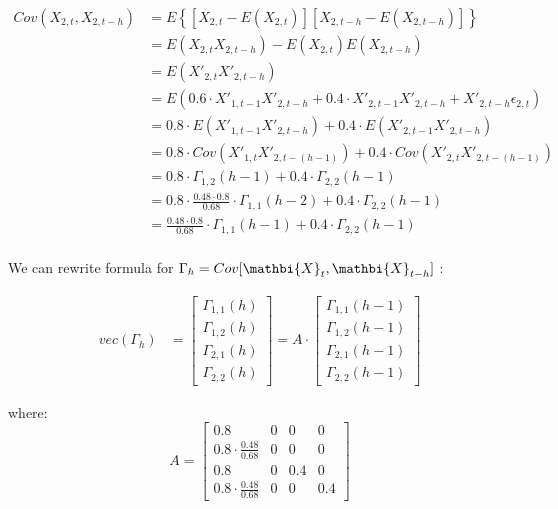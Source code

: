 \begin{solution}
\begin{equation}
\begin{aligned}
Cov(X_{2,t},X_{2,t-h}) 	& = E\left\{[X_{2,t} - E(X_{2,t})][X_{2,t-h} - E(X_{2,t-h})]\right\} \\
												& = E(X_{2,t}X_{2,t-h}) - E(X_{2,t})E(X_{2,t-h}) \\
												& = E(X'_{2,t}X'_{2,t-h})\\
												& = E\left(0.6 \cdot X'_{1,t-1}X'_{2,t-h} + 0.4 \cdot X'_{2,t-1}X'_{2,t-h} + X'_{2,t-h}\epsilon_{2,t} \right)\\
												& = 0.8 \cdot E(X'_{1,t-1}X'_{2,t-h}) + 0.4 \cdot E(X'_{2,t-1}X'_{2,t-h}) \\
												& = 0.8 \cdot Cov(X'_{1,t}X'_{2,t-(h-1)}) + 0.4 \cdot Cov(X'_{2,t}X'_{2,t-(h-1)}) \\
												& = 0.8 \cdot \Gamma_{1,2}(h-1) + 0.4 \cdot \Gamma_{2,2}(h-1) \\
												& = 0.8 \cdot\frac{0.48 \cdot 0.8}{0.68} \cdot \Gamma_{1,1}(h-2) + 0.4 \cdot \Gamma_{2,2}(h-1)\\
												& = \frac{0.48 \cdot 0.8}{0.68} \cdot \Gamma_{1,1}(h-1) + 0.4 \cdot \Gamma_{2,2}(h-1)\\
\end{aligned}
\end{equation}

We can rewrite formula for $\Gamma_h = Cov[\mathbi{X}_t,\mathbi{X}_{t-h}]$ :

\begin{equation}
\begin{aligned}
vec(\Gamma_h)  & =\left[\begin{array}{c} \Gamma_{1,1}(h) 							  \\ \Gamma_{1,2}(h)  \\ \Gamma_{2,1}(h) \\ \Gamma_{2,2}(h)  \end{array}\right] 
							   = A
									\cdot 
									\left[\begin{array}{c} \Gamma_{1,1}(h-1) 							\\ \Gamma_{1,2}(h-1)\\ \Gamma_{2,1}(h-1)\\ \Gamma_{2,2}(h-1)\end{array}\right]
\end{aligned}
\end{equation}

where:
\begin{equation}
              A = \left[\begin{array}{llll} 0.8             						& 0                 & 0                 & 0                \\
									                          0.8 \cdot \frac{0.48}{0.68} & 0                 & 0                 & 0                \\
																						0.8 											  & 0                 & 0.4               & 0                \\ 
																						0.8 \cdot \frac{0.48}{0.68} & 0                 & 0                 & 0.4              \end{array}\right]
\end{equation}


\end{solution}
